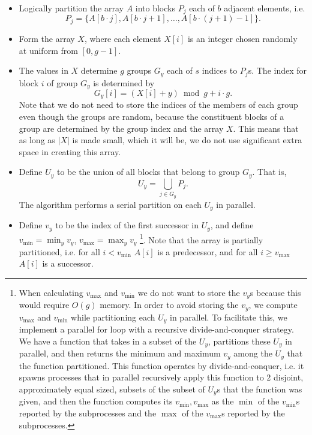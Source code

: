 \documentclass[sigconf]{acmart}
\theoremstyle{remark}
\theoremstyle{remark}
\begin{document}
\begin{itemize}
	\item Logically partition the array $A$ into blocks $P_j$ each of $b$ adjacent elements, i.e. $${P_j = \{A[b\cdot j], A[b\cdot j + 1], \ldots, A[b\cdot (j+1)-1]\}}.$$
	\item Form the array $X$, where each element $X[i]$ is an integer chosen randomly at uniform from $[0, g-1].$
	\item The values in $X$ determine $g$ groups $G_y$ each of $s$ indices to $P_j$s. The index for block $i$ of group $G_y$ is determined by
		$$G_y[i] = (X[i] + y) \bmod g + i\cdot g.$$
		Note that we do not need to store the indices of the members of each group even though the groups are random, because the constituent blocks of a group are determined by the group index and the array $X$. 
		This means that as long as $|X|$ is made small, which it will be, we do not use significant extra space in creating this array.  
	\item Define $U_y$ to be the union of all blocks that belong to group $G_y$. That is,
			$$U_y = \bigcup_{j\in G_y} P_j.$$ 
		The algorithm performs a serial partition on each $U_y$ in parallel.
	\item Define $v_y$ to be the index of the first successor in $U_y$, and define $v_{\text{min}}=\min_y{v_y}$,  $v_{\text{max}}=\max_y{v_y}$
		\footnote{When calculating $v_{\text{max}}$ and $v_{\text{min}}$ we do not want to store the $v_y$s because this would require $O(g)$ memory. 
In order to avoid storing the $v_y$, we compute $v_{\text{max}}$ and $v_{\text{min}}$ while partitioning each $U_y$ in parallel.
To facilitate this, we implement a parallel for loop with a recursive divide-and-conquer strategy. 
We have a function that takes in a subset of the $U_y$, partitions these $U_y$ in parallel, and then returns the minimum and maximum $v_y$ among the $U_y$ that the function partitioned.
This function operates by divide-and-conquer, i.e. it spawns processes that in parallel recursively apply this function to 2 disjoint, approximately equal sized, subsets of the subset of $U_y$s that the function was given, and then the function computes its $v_{\text{min}}, v_{\text{max}}$ as the $\min$ of the $v_{\text{min}}$s reported by the subprocesses and the $\max$ of the $v_{\text{max}}$s reported by the subprocesses.}. 
Note that the array is partially partitioned, i.e. for all $i < v_{\text{min}}$ $A[i]$ is a predecessor, and for all $i \ge v_\text{max}$ $A[i]$ is a successor.
\end{itemize}
\end{document}
